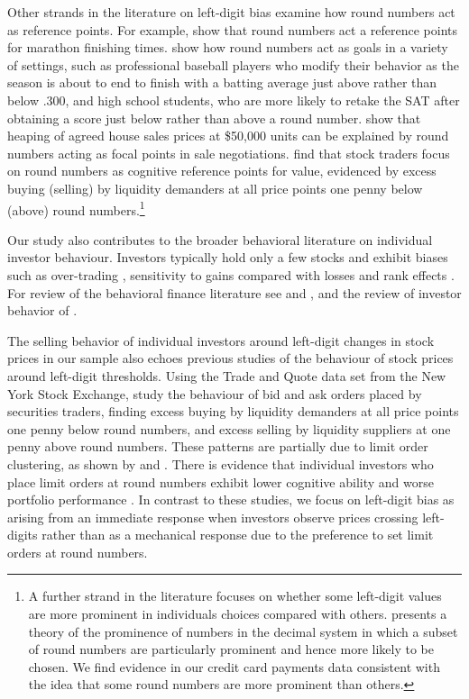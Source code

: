 Other strands in the literature on left-digit bias examine how round numbers act as reference points. For example, \cite{allen2016reference} show that round numbers act a reference points for marathon finishing times. \cite{pope2011round} show how round numbers act as goals in a variety of settings, such as professional baseball players who modify their behavior as the season is about to end to finish with a batting average just above rather than below .300, and high school students, who are more likely to retake the SAT after obtaining a score just below rather than above a round number. \cite{pope2015focal} show that heaping of agreed house sales prices at \$50,000 units can be explained by round numbers acting as focal points in sale negotiations. \cite{bhattacharya2012penny} find that stock traders focus on round numbers as cognitive reference points for value, evidenced by excess buying (selling) by liquidity demanders at all price points one penny below (above) round numbers.\footnote{A further strand in the literature focuses on whether some left-digit values are more prominent in individuals choices compared with others. \cite{albers1983prominence} presents a theory of the prominence of numbers in the decimal system in which a subset of round numbers are particularly prominent and hence more likely to be chosen. We find evidence in our credit card payments data consistent with the idea that some round numbers are more prominent than others.}

Our study also contributes to the broader behavioral literature on individual investor behaviour. Investors typically hold only a few stocks and exhibit biases such as over-trading \citep{barber2000}, sensitivity to gains compared with losses \citep{odean1998} and rank effects \citep{hartzmark2015}. For review of the behavioral finance literature see \cite{hirshleifer2015} and \cite{barberis2018}, and the review of investor behavior of \cite{barber2013}.

The selling behavior of individual investors around left-digit changes in stock prices in our sample also echoes previous studies of the behaviour of stock prices around left-digit thresholds. Using the Trade and Quote data set from the New York Stock Exchange, \cite{bhattacharya2012penny} study the behaviour of bid and ask orders placed by securities traders, finding excess buying by liquidity demanders at all price points one penny below round numbers, and excess selling by liquidity suppliers at one penny above round numbers. These patterns are partially due to limit order clustering, as shown by \cite{bourghelle2009limit} and \cite{chiao2009price}. There is evidence that individual investors who place limit orders at round numbers exhibit lower cognitive ability and worse portfolio performance \citep{kuo2015cognitive}. In contrast to these studies, we focus on left-digit bias as arising from an immediate response when investors observe prices crossing left-digits rather than as a mechanical response due to the preference to set limit orders at round numbers.  

